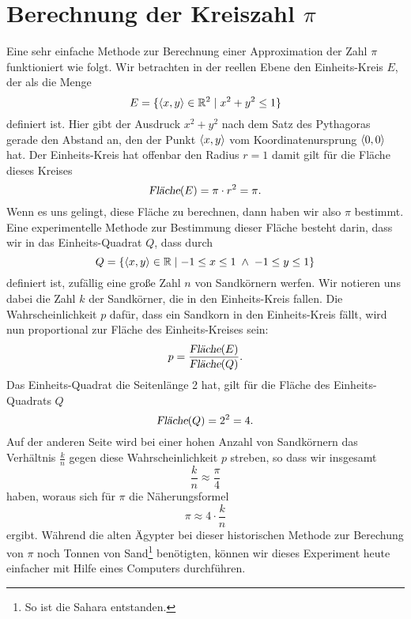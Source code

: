\section{Berechnung der Kreiszahl $\pi$}
Eine sehr einfache Methode zur Berechnung einer Approximation der Zahl $\pi$ funktioniert wie folgt.
Wir betrachten in der reellen Ebene den Einheits-Kreis $E$, der als die Menge
\[ E = \{ \pair(x,y) \in \mathbb{R}^2 \mid x^2 + y^2 \leq 1 \} \]
definiert ist.  Hier gibt der Ausdruck $x^2 + y^2$ nach dem Satz des Pythagoras gerade den Abstand an,
den der Punkt $\pair(x,y)$ vom Koordinatenursprung $\pair(0,0)$ hat.  Der Einheits-Kreis hat offenbar den
Radius $r = 1$ damit gilt f\"ur die Fl\"ache dieses Kreises
\[ \textsl{Fl\"ache}(E) = \pi \cdot r^2 = \pi. \]
Wenn es uns gelingt, diese Fl\"ache zu berechnen, dann haben wir also $\pi$ bestimmt.  Eine experimentelle
Methode zur Bestimmung dieser Fl\"ache besteht darin, dass wir in das Einheits-Quadrat $Q$, dass durch
\[ Q = \{ \pair(x,y) \in \mathbb{R} \mid -1 \leq x \leq 1 \;\wedge\; -1 \leq y \leq 1 \} \]
definiert ist, zuf\"allig eine gro{\ss}e Zahl $n$ von Sandk\"ornern werfen.  Wir notieren uns dabei die Zahl $k$ 
der Sandk\"orner, die in den Einheits-Kreis fallen.  Die Wahrscheinlichkeit $p$ daf\"ur, dass ein Sandkorn in den
Einheits-Kreis f\"allt, wird nun proportional zur Fl\"ache des Einheits-Kreises sein:
\[ p = \frac{\textsl{Fl\"ache}(E)}{\textsl{Fl\"ache}(Q)}. \]
Das Einheits-Quadrat die Seitenl\"ange 2 hat, gilt f\"ur die Fl\"ache des Einheits-Quadrats $Q$ 
\[ \textsl{Fl\"ache}(Q) = 2^2 = 4. \]
Auf der anderen Seite wird bei einer hohen Anzahl von Sandk\"ornern das Verh\"altnis $\frac{k}{n}$ gegen diese
Wahrscheinlichkeit $p$ streben, so dass wir insgesamt
\[ \frac{k}{n} \approx \frac{\pi}{4} \]
haben, woraus sich f\"ur $\pi$ die N\"aherungsformel
\[ \pi \approx 4 \cdot \frac{k}{n} \]
ergibt.  W\"ahrend die alten Ägypter bei dieser historischen Methode zur Berechung von $\pi$ noch Tonnen von
Sand\footnote{So ist die Sahara entstanden.}
ben\"otigten,  k\"onnen wir dieses Experiment heute einfacher mit Hilfe eines Computers durchf\"uhren.


